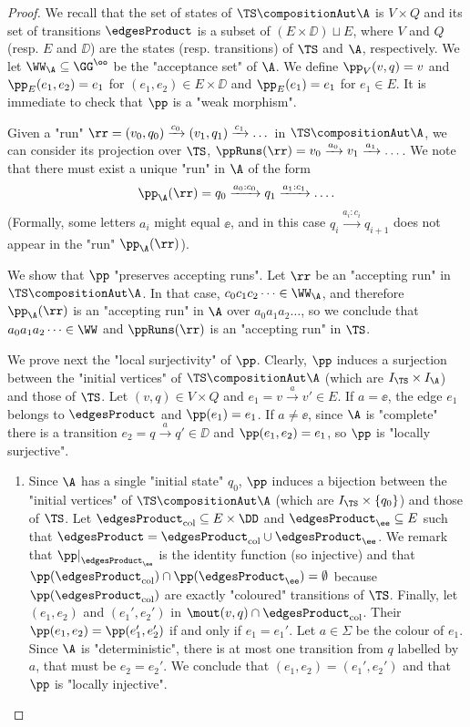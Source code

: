 \documentclass[10pt,a4paper]{amsart}
\newcommand\restr[2]{{%
		\left.\kern-\nulldelimiterspace %
		#1 %
		\littletaller %
		\right|_{#2} %
}}
\newcommand{\littletaller}{\mathchoice{\vphantom{\big|}}{}{}{}}
\renewcommand{\SS}{\Sigma}
\newcommand{\re}[1]{\xrightarrow{#1}}
\begin{document}
\begin{proof}
	We recall that the set of states of $\TS \compositionAut \A$ is $V\times Q$ and its set of transitions $\edgesProduct$ is a subset of $(E\times \DD) \sqcup E$, where $V$ and $Q$ (resp. $E$ and $\DD$) are the states (resp. transitions) of $\TS$ and $\A$, respectively.
	We let $\WW_\A\subseteq \GG^\oo$ be the "acceptance set" of $\A$.
	We define $\pp_V(v,q) = v$ and $\pp_E(e_1,e_2) = e_1$ for $(e_1,e_2)\in E\times \DD$ and $\pp_E(e_1) = e_1$ for $e_1\in E$.
	It is immediate to check that $\pp$ is a "weak morphism". 
	
	Given a "run" $\rr = (v_0,q_0) \re{c_0}  (v_1,q_1) \re{c_1} \dots$ in $\TS \compositionAut \A$, we can consider its projection over $\TS$, $\ppRuns(\rr) = v_0 \re{a_0}  v_1 \re{a_1} \dots$. We note that there must exist a unique "run" in $\A$ of the form 
	\[ \pp_\A(\rr) = q_0 \re{a_0:c_0}  q_1 \re{a_1:c_1} \dots .\]
	(Formally, some letters $a_i$ might equal $\ee$, and in this case $q_{i} \re{a_i:c_i}  q_{i+1}$ does not appear in the "run" $\pp_\A(\rr)$). 
	
	We show that $\pp$ "preserves accepting runs". Let $\rr$ be an "accepting run" in $\TS\compositionAut \A$. In that case, $c_0c_1c_2\dots \in \WW_\A$, and therefore $\pp_\A(\rr)$ is an "accepting run" in $\A$ over $a_0a_1a_2\dots$, so we conclude that $a_0a_1a_2\dots\in \WW$ and $\ppRuns(\rr)$ is an "accepting run" in $\TS$.
	
	We prove next the "local surjectivity" of $\pp$. Clearly, $\pp$ induces a surjection between the "initial vertices" of $\TS \compositionAut \A$ (which are $I_\TS \times I_\A$) and those of $\TS$. 
	Let $(v,q)\in V\times Q$ and $e_1 = v\re{a}v'\in E$. If $a=\ee$, the edge $e_1$ belongs to $\edgesProduct$ and $\pp(e_1)=e_1$. If $a\neq \ee$, since $\A$ is "complete" there is a transition $e_2 = q\re{a}q'\in \DD$ and $\pp(e_1,e_2) = e_1$, so $\pp$ is "locally surjective".
	
	\begin{enumerate}
		
		\item Since $\A$ has a single "initial state" $q_0$, $\pp$ induces a bijection between the "initial vertices" of $\TS \compositionAut \A$ (which are $I_\TS \times \{q_0\}$) and those of $\TS$.
		Let $\edgesProduct_\mathrm{col}\subseteq E\times \DD$ and $\edgesProduct_\ee\subseteq E$ such that $\edgesProduct = \edgesProduct_\mathrm{col} \cup \edgesProduct_\ee$. We remark that $\restr{\pp}{\edgesProduct_\ee}$ is the identity function (so injective) and that $\pp(\edgesProduct_\mathrm{col}) \cap \pp(\edgesProduct_\ee) = \emptyset$ because $\pp(\edgesProduct_\mathrm{col})$ are exactly "coloured" transitions of $\TS$. Finally, let $(e_1, e_2)$ and $(e_1', e_2')$ in $\mout(v,q) \cap \edgesProduct_\mathrm{col}$. Their $\pp(e_1, e_2) = \pp(e_1', e_2')$ if and only if $e_1 = e_1'$. Let $a\in \SS$ be the colour of $e_1$. Since $\A$ is "deterministic", there is at most one transition from $q$ labelled by $a$, that must be $e_2=e_2'$. We conclude that $(e_1, e_2)=(e_1', e_2')$ and that $\pp$ is "locally injective".
		

\end{enumerate}
\end{proof}
\end{document}
